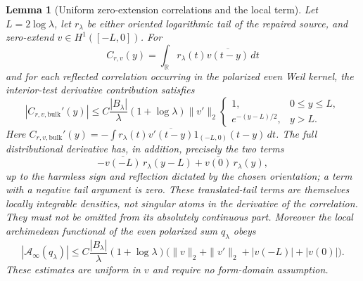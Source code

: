 \documentclass[11pt]{article}
\newtheorem{lemma}[theorem]{Lemma}
\theoremstyle{remark}
\begin{document}
\begin{lemma}[Uniform zero-extension correlations and the local term]
\label{lem:v13-correlations}
Let $L=2\log\lambda$, let $r_\lambda$ be either oriented logarithmic tail
of the repaired source, and zero-extend $v\in H^1([-L,0])$. For
\[
 C_{r,v}(y)=\int_{\mathbb R}r_\lambda(t)
                  \overline{v(t-y)}\,dt
\]
and for each reflected correlation occurring in the polarized even Weil
kernel, the interior-test derivative contribution satisfies
\begin{equation}\label{eq:pswf-cross-tail}
 \boxed{
 |C_{r,v,\mathrm{bulk}}'(y)|
 \le C\frac{|B_\lambda|}{\lambda}(1+\log\lambda)
       \|v'\|_2
 \begin{cases}
  1,&0\le y\le L,\\[2mm]
  e^{-(y-L)/2},&y>L.
 \end{cases}}
\end{equation}
Here $C_{r,v,\mathrm{bulk}}'(y)=-\int r_\lambda(t)
\overline{v'(t-y)}1_{(-L,0)}(t-y)\,dt$.
The full distributional derivative has, in addition, precisely the two terms
\begin{equation}\label{eq:v13-correlation-jumps}
 -\overline{v(-L)}\,r_\lambda(y-L)
 +\overline{v(0)}\,r_\lambda(y),
\end{equation}
up to the harmless sign and reflection dictated by the chosen orientation;
a term with a negative tail argument is zero. These translated-tail terms
are themselves locally integrable densities, not singular atoms in the
derivative of the correlation. They must not be omitted from its
absolutely continuous part. Moreover the local
archimedean functional of the even polarized sum $q_\lambda$ obeys
\begin{equation}\label{eq:v13-archimedean}
 |\mathcal A_\infty(q_\lambda)|
 \le C\frac{|B_\lambda|}{\lambda}(1+\log\lambda)
 \bigl(\|v\|_2+\|v'\|_2+|v(-L)|+|v(0)|\bigr).
\end{equation}
These estimates are uniform in $v$ and require no form-domain assumption.
\end{lemma}
\end{document}
